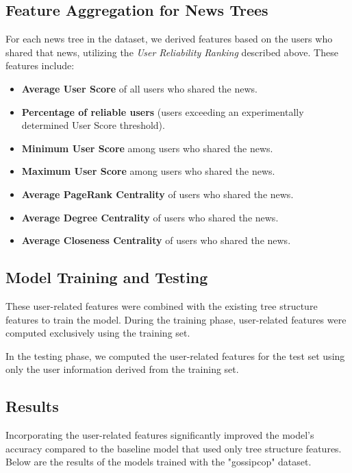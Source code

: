 \documentclass[11pt,a4paper]{article}
\begin{document}
\subsection*{Feature Aggregation for News Trees}
For each news tree in the dataset, we derived features based on the users who shared that news, utilizing the \textit{User Reliability Ranking} described above. These features include:
\begin{itemize}
    \item \textbf{Average User Score} of all users who shared the news.
    \item \textbf{Percentage of reliable users} (users exceeding an experimentally determined User Score threshold).
    \item \textbf{Minimum User Score} among users who shared the news.
    \item \textbf{Maximum User Score} among users who shared the news.
    \item \textbf{Average PageRank Centrality} of users who shared the news.
    \item \textbf{Average Degree Centrality} of users who shared the news.
    \item \textbf{Average Closeness Centrality} of users who shared the news.
\end{itemize}

\subsection*{Model Training and Testing}
These user-related features were combined with the existing tree structure features to train the model. During the training phase, user-related features were computed exclusively using the training set.

In the testing phase, we computed the user-related features for the test set using only the user information derived from the training set.

\subsection*{Results}
Incorporating the user-related features significantly improved the model's accuracy compared to the baseline model that used only tree structure features. Below are the results of the models trained with the "gossipcop" dataset.
\end{document}

